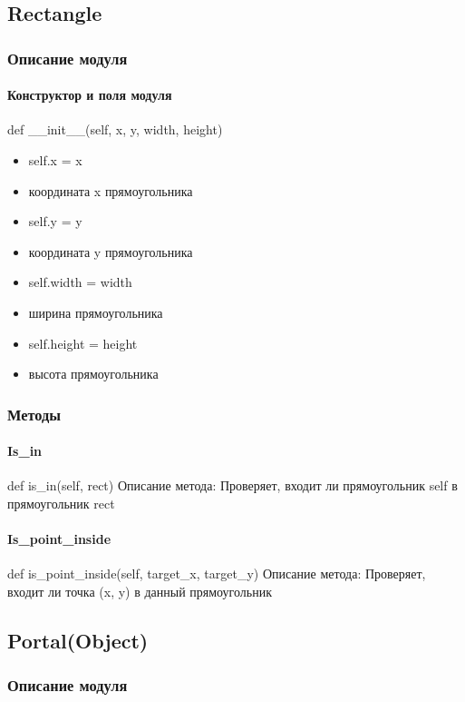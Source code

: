 \subsection{Rectangle}
\subsubsection{Описание модуля}
\paragraph{Конструктор и поля модуля}
def \_\_init\_\_(self, x, y, width, height)
\begin{itemize}
	\item self.x = x
	\item координата x прямоугольника
	\item self.y = y
	\item координата y прямоугольника
	\item self.width = width
	\item ширина прямоугольника
	\item self.height = height
	\item высота прямоугольника
\end{itemize}
\subsubsection{Методы}
\paragraph{Is\_in}
def is\_in(self, rect)
Описание метода: Проверяет, входит ли прямоугольник self в прямоугольник rect
\paragraph{Is\_point\_inside}
def is\_point\_inside(self, target\_x, target\_y)
Описание метода: Проверяет, входит ли точка (x, y) в данный прямоугольник

\subsection{Portal(Object)}
\subsubsection{Описание модуля}
